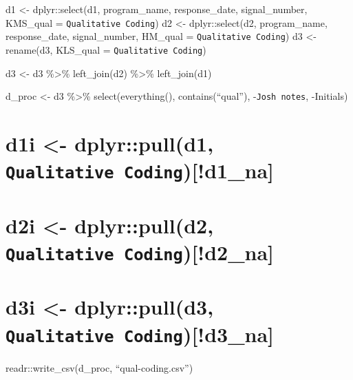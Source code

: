 \documentclass[]{book}
\theoremstyle{definition}
\theoremstyle{definition}
\theoremstyle{definition}
\theoremstyle{remark}
\begin{document}
d1 \textless{}- dplyr::select(d1, program\_name, response\_date,
signal\_number, KMS\_qual = \texttt{Qualitative\ Coding}) d2
\textless{}- dplyr::select(d2, program\_name, response\_date,
signal\_number, HM\_qual = \texttt{Qualitative\ Coding}) d3 \textless{}-
rename(d3, KLS\_qual = \texttt{Qualitative\ Coding})

d3 \textless{}- d3 \%\textgreater{}\% left\_join(d2) \%\textgreater{}\%
left\_join(d1)

d\_proc \textless{}- d3 \%\textgreater{}\% select(everything(),
contains(``qual''), -\texttt{Josh\ notes}, -Initials)

\chapter{\texorpdfstring{d1i \textless{}- dplyr::pull(d1,
\texttt{Qualitative\ Coding}){[}!d1\_na{]}}{d1i \textless{}- dplyr::pull(d1, Qualitative Coding){[}!d1\_na{]}}}\label{d1i---dplyrpulld1-qualitative-codingd1_na}

\chapter{\texorpdfstring{d2i \textless{}- dplyr::pull(d2,
\texttt{Qualitative\ Coding}){[}!d2\_na{]}}{d2i \textless{}- dplyr::pull(d2, Qualitative Coding){[}!d2\_na{]}}}\label{d2i---dplyrpulld2-qualitative-codingd2_na}

\chapter{\texorpdfstring{d3i \textless{}- dplyr::pull(d3,
\texttt{Qualitative\ Coding}){[}!d3\_na{]}}{d3i \textless{}- dplyr::pull(d3, Qualitative Coding){[}!d3\_na{]}}}\label{d3i---dplyrpulld3-qualitative-codingd3_na}

readr::write\_csv(d\_proc, ``qual-coding.csv'')
\end{document}
